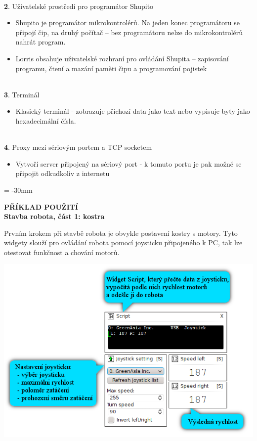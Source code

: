 \documentclass[12pt, a4paper, oneside]{article}
\newcommand{\B}{\textbf} %
\begin{document}
\\{\large \B 2. Uživatelské prostředí pro programátor Shupito }

\begin{itemize}
    \item Shupito je programátor mikrokontrolérů. Na jeden konec programátoru se připojí čip, na druhý počítač -- bez programátoru nelze do mikrokontrolérů nahrát program.
    \item Lorris obsahuje uživatelské rozhraní pro ovládání Shupita -- zapisování programu, čtení a mazání paměti čipu a programování pojistek
\end{itemize}

\\{\large \B 3. Terminál }

\begin{itemize}
    \item Klasický terminál - zobrazuje příchozí data jako text nebo vypisuje byty jako hexadecimální čísla.
\end{itemize}

\\{\large \B 4. Proxy mezi sériovým portem a TCP socketem }

\begin{itemize}
    \item Vytvoří server připojený na sériový port - k tomuto portu je pak možné se připojit odkudkoliv z internetu
\end{itemize}

\newpage
\voffset = -30mm %
\begin{center}
    \Large \B{PŘÍKLAD POUŽITÍ \\ Stavba robota, část 1: kostra}
\end{center}
\vspace{5mm}
Prvním krokem při stavbě robota je obvykle postavení kostry s motory. Tyto widgety slouží pro ovládání robota pomocí joysticku připojeného k PC, tak lze otestovat funkčnost a chování motorů.
\vspace{30mm}
\begin{center}
\includegraphics{img/joystick2.png}
\end{center}
\end{document}
